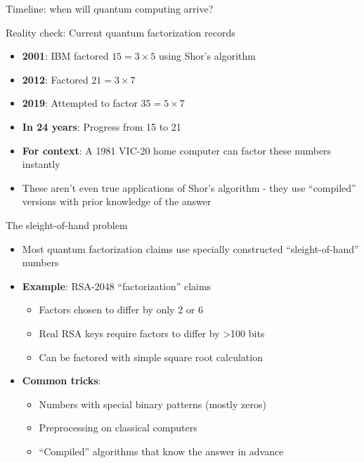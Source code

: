 \documentclass[aspectratio=169, lualatex, handout]{beamer}
\begin{document}
\begin{frame}{Timeline: when will quantum computing arrive?}
\end{frame}

\begin{frame}{Reality check: Current quantum factorization records}
	\begin{itemize}
		\item \textbf{2001}: IBM factored $15 = 3 \times 5$ using Shor's algorithm
		\item \textbf{2012}: Factored $21 = 3 \times 7$
		\item \textbf{2019}: Attempted to factor $35 = 5 \times 7$
		\item \textbf{In 24 years}: Progress from 15 to 21
		\item \textbf{For context}: A 1981 VIC-20 home computer can factor these numbers instantly
		\item These aren't even true applications of Shor's algorithm - they use ``compiled'' versions with prior knowledge of the answer
	\end{itemize}
\end{frame}

\begin{frame}{The sleight-of-hand problem}
	\begin{itemize}
		\item Most quantum factorization claims use specially constructed ``sleight-of-hand'' numbers
		\item \textbf{Example}: RSA-2048 ``factorization'' claims
		      \begin{itemize}
			      \item Factors chosen to differ by only 2 or 6
			      \item Real RSA keys require factors to differ by >100 bits
			      \item Can be factored with simple square root calculation
		      \end{itemize}
		\item \textbf{Common tricks}:
		      \begin{itemize}
			      \item Numbers with special binary patterns (mostly zeros)
			      \item Preprocessing on classical computers
			      \item ``Compiled'' algorithms that know the answer in advance
		      \end{itemize}
	\end{itemize}
\end{frame}
\end{document}

